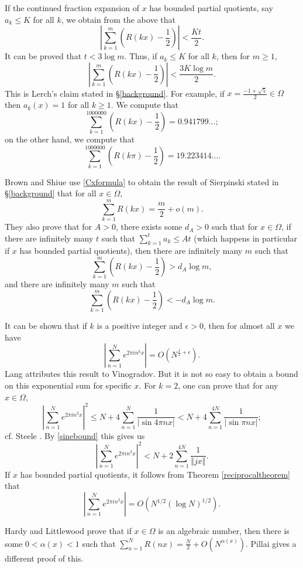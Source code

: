 \documentclass{amsart}
\newcommand{\norm}[1]{\left\Vert #1 \right\Vert}
\begin{document}
If the continued fraction expansion of $x$ has bounded partial quotients, say $a_k \leq K$ for all $k$, we obtain from the above that
\[
\left| \sum_{k=1}^m \left(R(kx)-\frac{1}{2}\right) \right| < \frac{Kt}{2}.
\]
It can be proved \cite[p.~185, Fact~2]{MR1316813} that $t<3\log m$. Thus, if $a_k \leq K$ for all $k$, then for $m \geq 1$,
\[
\left| \sum_{k=1}^m \left(R(kx)-\frac{1}{2}\right) \right| < \frac{3K\log m}{2}.
\]
This is Lerch's claim stated in \S \ref{background}.
For example, if  $x=\frac{-1+\sqrt{5}}{2} \in \Omega$ then $a_k(x)=1$ for all $k \geq 1$. We compute that 
\[
\sum_{k=1}^{1000000} \left(R(kx)-\frac{1}{2}\right)=0.941799\ldots;
\]
on the other hand, we compute that
\[
\sum_{k=1}^{1000000} \left( R(k\pi)-\frac{1}{2} \right)=19.223414\ldots.
\]

Brown and Shiue \cite[p.~185, Fact~1]{MR1316813}  use \eqref{Cxformula} to obtain the result of Sierpinski stated in \S \ref{background} that
for all $x \in \Omega$,
\[
\sum_{k=1}^m R(kx)=\frac{m}{2}+o(m).
\]
They also prove \cite[p.~188, Theorem~4]{MR1316813} that for $A>0$, there exists some $d_A>0$ such that for $x \in \Omega$, if there
are infinitely many  $t$ such that $\sum_{k=1}^t a_k \leq At$ (which happens in particular if $x$ has bounded partial quotients), then there are infinitely many $m$ such that
\[
\sum_{k=1}^m \left(R(kx)-\frac{1}{2}\right)>d_A \log m,
\]
and there are infinitely many $m$ such that
\[
\sum_{k=1}^m \left(R(kx)-\frac{1}{2}\right)< -d_A \log m.
\]

It can be shown \cite[p.~44, Theorem 4]{MR0209227} that if $k$ is a positive integer 
and $\epsilon>0$, then
for almost all $x$ we have 
\[
\left| \sum_{n=1}^N e^{2\pi i n^k x} \right| = O\left( N^{\frac{1}{2}+\epsilon}\right).
\]
Lang attributes this result to Vinogradov. But it is not so easy to obtain a bound on this exponential sum for specific $x$. For $k=2$, one can prove
\cite[p.~45, Lemma]{MR0209227}  that for any $x \in \Omega$,
\[
\left| \sum_{n=1}^N e^{2\pi i n^2 x} \right|^2 \leq N + 4\sum_{n=1}^N \frac{1}{|\sin 4\pi n x|}<
N+4\sum_{n=1}^{4N}  \frac{1}{|\sin \pi n x|};
\]
cf. Steele \cite[Problem 14.2]{steele}.
By \eqref{sinebound} this gives us
\[
\left| \sum_{n=1}^N e^{2\pi i n^2 x} \right|^2 < N+2\sum_{n=1}^{4N} \frac{1}{\norm{jx}}.
\]
If $x$ has bounded partial quotients, it follows from Theorem \ref{reciprocaltheorem} that
\[
\left| \sum_{n=1}^N e^{2\pi i n^2 x} \right| = O\left(N^{1/2}(\log N)^{1/2}\right).
\]

Hardy and Littlewood \cite[p.~28, Theorem B5]{latticeI} prove  that if $x \in \Omega$ is an algebraic number, then
there is some $0<\alpha(x)<1$ such that $\sum_{n=1}^N R(nx) = \frac{N}{2} + O(N^{\alpha(x)})$.
Pillai \cite{pillai1}  gives a different proof of this. 
\end{document}
